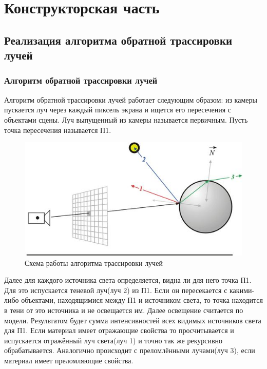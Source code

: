 \section{Конструкторская часть}

\subsection{Реализация алгоритма обратной трассировки лучей}

\subsubsection{Алгоритм обратной трассировки лучей}

Алгоритм обратной трассировки лучей работает следующим образом: из камеры пускается луч через каждый пиксель экрана и ищется его пересечения с объектами сцены. Луч выпущенный из камеры называется первичным. Пусть точка пересечения называется П1.

\begin{figure}[hbtp]
	\centering
	\includegraphics[scale=0.8]{img/trace_2.jpg}
	\caption{Схема работы алгоритма трассировки лучей}
	\label{fig:trace}
\end{figure}				

Далее для каждого источника света определяется, видна ли для него точка П1. Для это испускается теневой луч(луч 2) из П1. Если он пересекается с какими-либо объектами, находящимися между П1 и источником света, то точка находится в тени от это источника и не освещается им. Далее освещение считается по модели. Результатом будет сумма интенсивностей всех видимых источников света для П1. Если материал имеет отражающие свойства то просчитывается и испускается отражённый луч света(луч 1) и точно так же рекурсивно обрабатывается. Аналогично происходит с преломлёнными лучами(луч 3), если материал имеет преломляющие свойства.

